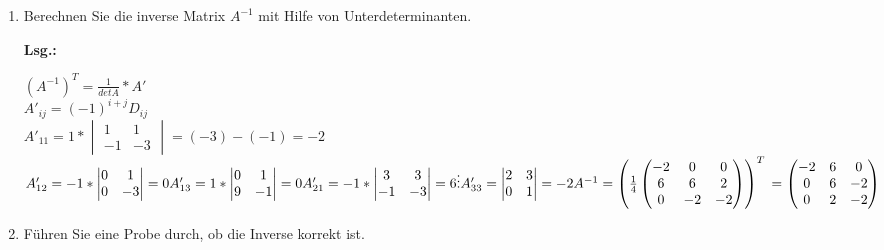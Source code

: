 \documentclass[12pt,a4paper]{scrreprt}
\newcommand{\Lsg}{\textbf{Lsg.:}}
\begin{document}
\begin{enumerate}
\begin{enumerate}
\Lsg

wenn $det A \neq 0$, dann existiert $A^{-1}$ \\
Zeile (2 zu 3) addieren um Determinante einfach berechnen zu können\\
$det A = (-2)*(-2) = 4 \Rightarrow A^{-1}$ existiert

		\item Berechnen Sie die inverse Matrix $A^{-1}$ mit Hilfe von Unterdeterminanten.

\Lsg

$
(A^{-1})^T = \frac{1}{det A}*A'$	\\
$A'_{ij} = (-1)^{i+j}D_{ij}$ 	\\%
$A'_{11} = 1 * \begin{vmatrix} 1 & 1 \\ -1 & -3 \end{vmatrix} = (-3)-(-1) = -2$	\\
$A'_{12} = -1 * \begin{vmatrix} 0 & 1 \\ 0 & -3 \end{vmatrix} = 0	\\
A'_{13} = 1 * \begin{vmatrix} 0 & 1 \\ 9 & -1 \end{vmatrix} = 0	\\
A'_{21} = -1* \begin{vmatrix} 3 & 3 \\ -1 & -3 \end{vmatrix} = 6	\\
\vdots	\\
A'_{33} = \begin{vmatrix} 2 & 3 \\ 0 & 1 \end{vmatrix} = -2	\\
A^{-1} = \left( \frac{1}{4} \begin{pmatrix} -2 & 0 & 0 \\ 6 & 6 & 2 \\ 0 & -2 & -2 \end{pmatrix} \right)^T	\\
= \begin{pmatrix} -2 & 6 & 0 \\ 0 & 6 & -2 \\ 0 & 2 & -2 \end{pmatrix} 	\\
$

		\item Führen Sie eine Probe durch, ob die Inverse korrekt ist.


\end{enumerate}
\end{enumerate}
\end{document}
